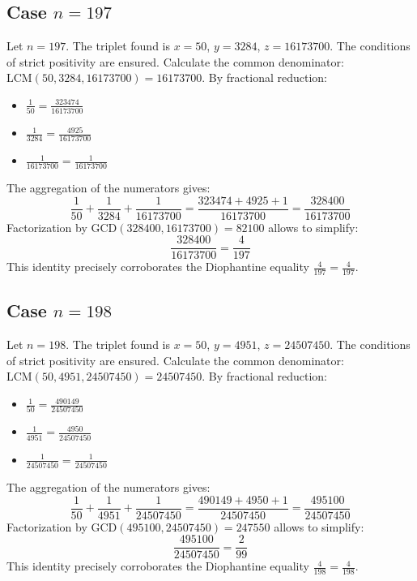 \documentclass[11pt,a4paper]{article}
\begin{document}
\subsection{Case $n = 197$}
Let $n = 197$. The triplet found is $x = 50$, $y = 3284$, $z = 16173700$.
The conditions of strict positivity are ensured.
Calculate the common denominator: $\text{LCM}(50, 3284, 16173700) = 16173700$.
By fractional reduction:
\begin{itemize}
    \item $\frac{1}{50} = \frac{323474}{16173700}$
    \item $\frac{1}{3284} = \frac{4925}{16173700}$
    \item $\frac{1}{16173700} = \frac{1}{16173700}$
\end{itemize}
The aggregation of the numerators gives:
$$ \frac{1}{50} + \frac{1}{3284} + \frac{1}{16173700} = \frac{323474 + 4925 + 1}{16173700} = \frac{328400}{16173700} $$
Factorization by $\text{GCD}(328400, 16173700) = 82100$ allows to simplify:
$$ \frac{328400}{16173700} = \frac{4}{197} $$
This identity precisely corroborates the Diophantine equality $\frac{4}{197} = \frac{4}{197}$.

\subsection{Case $n = 198$}
Let $n = 198$. The triplet found is $x = 50$, $y = 4951$, $z = 24507450$.
The conditions of strict positivity are ensured.
Calculate the common denominator: $\text{LCM}(50, 4951, 24507450) = 24507450$.
By fractional reduction:
\begin{itemize}
    \item $\frac{1}{50} = \frac{490149}{24507450}$
    \item $\frac{1}{4951} = \frac{4950}{24507450}$
    \item $\frac{1}{24507450} = \frac{1}{24507450}$
\end{itemize}
The aggregation of the numerators gives:
$$ \frac{1}{50} + \frac{1}{4951} + \frac{1}{24507450} = \frac{490149 + 4950 + 1}{24507450} = \frac{495100}{24507450} $$
Factorization by $\text{GCD}(495100, 24507450) = 247550$ allows to simplify:
$$ \frac{495100}{24507450} = \frac{2}{99} $$
This identity precisely corroborates the Diophantine equality $\frac{4}{198} = \frac{4}{198}$.
\end{document}
